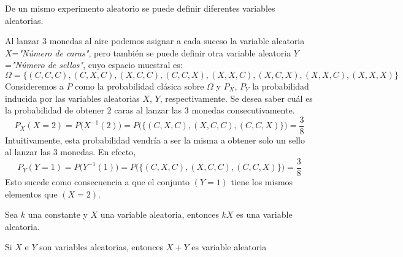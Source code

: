 De un mismo experimento aleatorio se puede definir diferentes variables aleatorias.
\begin{Ejm}
    Al lanzar $3$ monedas al aire podemos asignar a cada suceso la variable aleatoria $X$=\textit{"Número de caras"}, pero también se puede definir otra variable aleatoria $Y$=\textit{"Número de sellos"}, cuyo espacio muestral es:
    $$\Omega = \{(C,C,C),(C,X,C), (X,C,C), (C,C,X), (X,X,C), (X,C,X), (X,X,C), (X,X,X)\}$$
Consideremos a $P$ como la probabilidad clásica sobre $\Omega$ y $P_X$, $P_Y$ la probabilidad inducida por las variables aleatorias $X$, $Y$, respectivamente.
Se desea saber cuál es la probabilidad de obtener $2$ caras al lanzar las $3$ monedas consecutivamente.
$$P_{X}(X=2)= P\big(X^{-1}(2)\big)= P\big(\big\{(C,X,C), (X,C,C), (C,C,X)\big\}\big)=\frac{3}{8}$$
Intuitivamente, esta probabilidad vendría a ser la misma a obtener solo un sello al lanzar las $3$ monedas.
En efecto,
$$P_{Y}(Y=1)= P\big(Y^{-1}(1)\big)= P\big(\big\{(C,X,C), (X,C,C), (C,C,X)\big\}\big)=\frac{3}{8}$$
Esto sucede como consecuencia a que el conjunto $(Y=1)$ tiene los mismos elementos que $(X=2)$.
\end{Ejm}
\begin{Prop}
    Sea $k$ una constante y $X$ una variable aleatoria, entonces $k X$ es una variable aleatoria.
    \label{prop-variableAl-cXesVA}
\end{Prop}
\begin{Prop}
    Si $X$ e $Y$ son variables aleatorias, entonces $X+Y$ es variable aleatoria
    \label{prop-variableAl-X+YesVA}
\end{Prop}
\begin{comment}
\begin{Def}
    Sean los espacios de probabilidad $(\Omega_1,\thinspace\mathscr{F}_1,\thinspace P_1)$, $(\Omega_2,\thinspace\mathscr{F}_2,\thinspace P_2)$.
    Un vector aleatorio es una función $X:\Omega_1\rightarrow\Omega_2$ tal que para cualquier conjunto B en $\mathscr{F}_2$, se cumple que la imagen inversa $X^{-1}(B)$ es un elemento de $\mathscr{F}_1$.
\end{Def}
Dado entonces que un vector aleatorio es una función de $\Omega$ en $\R^n$, este
puede representar de la forma $X=(X_1,\ldots, X_n)$ en donde cada coordenada es una función de $\Omega$ en $\R$.
\begin{Prop}
    Una función $(X_1 , . . . , X_n):\Omega\rightarrow R^n$ es un vector aleatorio si y solo si, cada coordenada es una variable aleatoria.
\end{Prop}
El resultado es análogo al caso unidimensional y puede extenderse al caso de $n$ dimensiones.
En la mayoría de los casos, las definiciones y resultados son de fácil extensi\'on a dimensiones mayores.\\
\begin{Obs}
    El vector aleatorio $(A,\thinspace B)$ se interpreta cuan probable es que suceda $A$ y $B$ a la vez. Es decir $P(A,\thinspace B)=P(A\cap B)$.
\end{Obs}
\end{comment}
